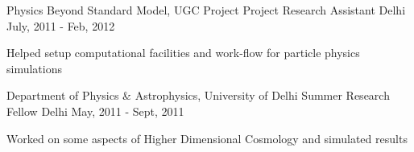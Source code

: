 \begin{cventries}
	
	\cventry
	{Physics Beyond Standard Model, UGC Project} %
	{Project Research Assistant} %
	{Delhi} %
	{July, 2011 - Feb, 2012} %
	{
		\begin{cvitems} 
			\item {Helped setup computational facilities and work-flow for particle physics simulations}
		\end{cvitems}
	}
	
\end{cventries}
\begin{cventries}
	
	\cventry
	{Department of Physics \& Astrophysics, University of Delhi} %
	{Summer Research Fellow} %
	{Delhi} %
	{May, 2011 - Sept, 2011} %
	{
		\begin{cvitems} 
			\item {Worked on some aspects of Higher Dimensional Cosmology and simulated results}
		\end{cvitems}
	}
	
\end{cventries}
\newpage

